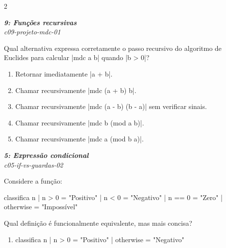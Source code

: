 \documentclass[a4paper,10pt,brazil]{article}
\begin{document}
\begin{multicols}{2}
\begin{flushright}
  \footnotesize
  \textit{\textbf{9: Funções recursivas}}\\
  \textit{c09-projeto-mdc-01}\\

\end{flushright}
Qual alternativa expressa corretamente o passo recursivo do algoritmo de Euclides para calcular \haskellinline|mdc a b| quando \haskellinline|b > 0|?

\begin{enumerate}
  \item Retornar imediatamente \haskellinline|a + b|.

  \item Chamar recursivamente \haskellinline|mdc (a + b) b|.

  \item Chamar recursivamente \haskellinline|mdc (a - b) (b - a)| sem verificar sinais.

  \item Chamar recursivamente \haskellinline|mdc b (mod a b)|.

  \item Chamar recursivamente \haskellinline|mdc a (mod b a)|.


\end{enumerate}

\begin{flushright}
  \footnotesize
  \textit{\textbf{5: Expressão condicional}}\\
  \textit{c05-if-vs-guardas-02}\\

\end{flushright}
Considere a função:
\begin{haskellcode}
classifica n
  | n > 0     = "Positivo"
  | n < 0     = "Negativo"
  | n == 0    = "Zero"
  | otherwise = "Impossível"
\end{haskellcode}
Qual definição é funcionalmente equivalente, mas mais concisa?

\begin{enumerate}
  \item \begin{haskellcode}
classifica n
  | n > 0     = "Positivo"
  | otherwise = "Negativo"
\end{haskellcode}


\end{enumerate}
\end{multicols}
\end{document}

